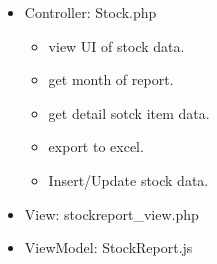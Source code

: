 \documentclass[letterpaper,10pt,english,openany,oneside]{sphinxmanual}
\begin{document}
\begin{itemize}
\item {} 
\sphinxAtStartPar
Controller: Stock.php
\begin{itemize}
\item {} 
\sphinxAtStartPar
{} view UI of stock data.

\item {} 
\sphinxAtStartPar
{} get month of report.

\item {} 
\sphinxAtStartPar
{} get detail sotck item data.

\item {} 
\sphinxAtStartPar
{} export to excel.

\item {} 
\sphinxAtStartPar
{} Insert/Update stock data.

\end{itemize}

\begin{sphinxVerbatim}[commandchars=\\\{\}]
   
 
\end{sphinxVerbatim}

\item {} 
\sphinxAtStartPar
View: stockreport\_view.php

\item {} 
\sphinxAtStartPar
ViewModel: StockReport.js

\end{itemize}
\end{document}
